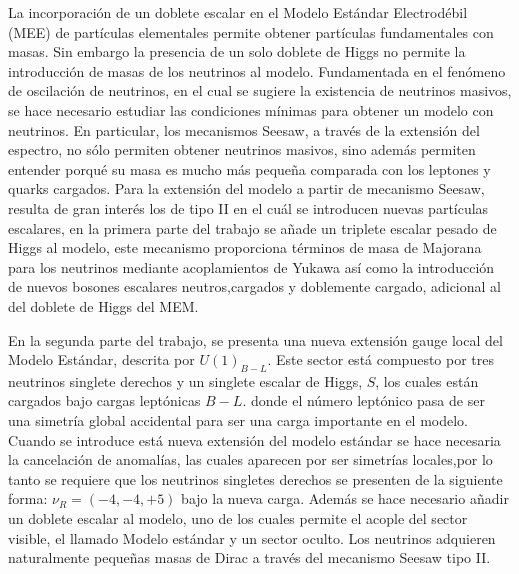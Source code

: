 \documentclass[12pt]{article}
\begin{document}
La incorporación de un doblete escalar en el Modelo Estándar
Electrodébil (MEE) de partículas elementales permite obtener partículas fundamentales con masas. Sin embargo la presencia de un solo doblete de Higgs no permite la introducción de masas de los neutrinos al modelo. Fundamentada en el fenómeno de oscilación de neutrinos, en el cual se sugiere la existencia de neutrinos masivos, se hace necesario estudiar las condiciones mínimas para obtener un modelo con neutrinos. En particular, los mecanismos Seesaw, a través de la extensión del espectro, no sólo permiten obtener neutrinos masivos, sino además permiten entender porqué su masa es mucho más pequeña comparada con los leptones y quarks cargados. Para la extensión del modelo a partir de mecanismo Seesaw, resulta de gran interés los de tipo II en el cuál se introducen nuevas partículas escalares, en la primera parte del trabajo se añade un triplete escalar pesado de Higgs al modelo, este mecanismo proporciona términos de masa de Majorana para los neutrinos mediante acoplamientos de Yukawa así como la introducción de nuevos bosones escalares neutros,cargados y doblemente cargado,  adicional al del doblete de Higgs del MEM. 


En la segunda parte del trabajo, se presenta una nueva extensión gauge local del Modelo Estándar, descrita por $U(1)_{B-L}$. Este sector está compuesto por tres neutrinos singlete derechos y un singlete escalar de Higgs, $S$, los cuales están cargados bajo cargas leptónicas ${B-L}$. donde el número leptónico pasa de ser una simetría global accidental para ser una carga importante en el modelo.  Cuando se introduce está nueva extensión del modelo estándar se hace necesaria la cancelación de anomalías, las cuales aparecen por ser simetrías locales,por lo tanto se requiere que los neutrinos singletes derechos se presenten de la siguiente forma: $\nu_R=(-4,-4,+5)$ bajo la nueva carga. Además se hace necesario añadir un doblete escalar al modelo, uno de los cuales permite el acople del sector visible, el llamado Modelo estándar y un sector oculto. Los neutrinos adquieren naturalmente pequeñas masas de Dirac a través del mecanismo Seesaw tipo II. 
\end{document}
